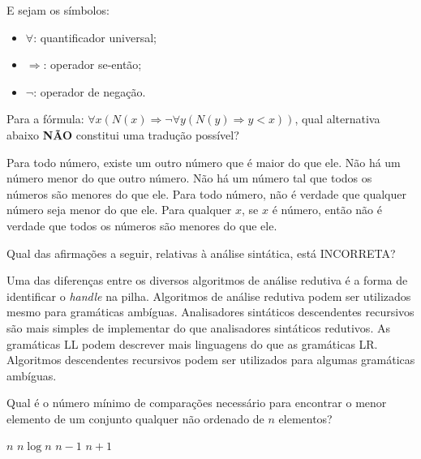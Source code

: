 \documentclass[12pt, addpoints]{exam}
\begin{document}
\begin{questions}
\begin{itemize}
\end{itemize}



E sejam os símbolos:

\begin{itemize}

    \item \( \forall \): quantificador universal;

    \item \( \Rightarrow \): operador se-então;

    \item \( \neg \): operador de negação.

\end{itemize}



Para a fórmula: \( \forall x (N(x) \Rightarrow \neg \forall y (N(y) \Rightarrow y < x)) \), qual alternativa abaixo \textbf{NÃO} constitui uma tradução possível?


\begin{choices}
\choice Para todo número, existe um outro número que é maior do que ele.
\choice Não há um número menor do que outro número.
\choice Não há um número tal que todos os números são menores do que ele.
\choice Para todo número, não é verdade que qualquer número seja menor do que ele.
\choice Para qualquer \( x \), se \( x \) é número, então não é verdade que todos os números são menores do que ele.
\end{choices}

\question

Qual das afirmações a seguir, relativas à análise sintática, está INCORRETA?


\begin{choices}
\choice Uma das diferenças entre os diversos algoritmos de análise redutiva é a forma de identificar o \textit{handle} na pilha.
\choice Algoritmos de análise redutiva podem ser utilizados mesmo para gramáticas ambíguas.
\choice Analisadores sintáticos descendentes recursivos são mais simples de implementar do que analisadores sintáticos redutivos.
\choice As gramáticas LL podem descrever mais linguagens do que as gramáticas LR.
\choice Algoritmos descendentes recursivos podem ser utilizados para algumas gramáticas ambíguas.
\end{choices}

\question

Qual é o número mínimo de comparações necessário para encontrar o menor elemento de um conjunto qualquer não ordenado de \( n \) elementos?
\begin{choices}
\choice \( n \)
\choice \( n \log n \)
\choice \( n - 1 \)
\choice \( n + 1 \)
\end{choices}


\end{questions}
\end{document}
